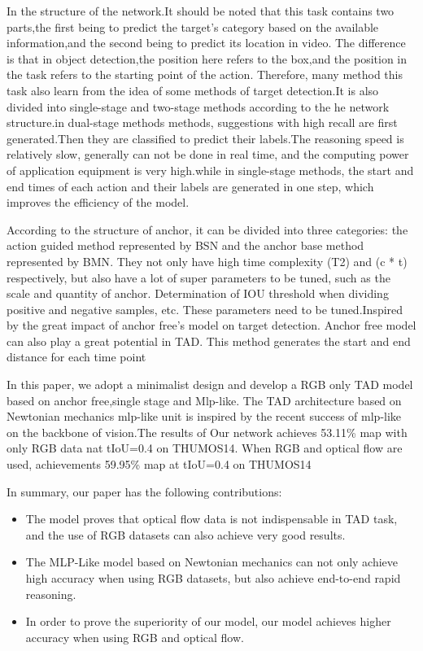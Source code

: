 \documentclass[10pt,twocolumn,letterpaper]{article}
\begin{document}
In the structure of the network.It should be noted that this task contains two parts,the first being to predict the target's category based on the available information,and the second being to predict its location in video. The difference is that in object detection,the position here refers to the box,and the position in the task refers to the starting point of the action. Therefore, many method this task also learn from the idea of some methods of target detection.It is also divided into single-stage and two-stage methods according to the he network structure.in dual-stage methods methods, suggestions with high recall are first generated.Then they are classified to predict their labels.The reasoning speed is relatively slow, generally can not be done in real time, and the computing power of application equipment is very high.while in single-stage methods, the start and end times of each action and their labels are generated in one step, which improves the efficiency of the model.

According to the structure of anchor, it can be divided into three categories: the action guided method represented by BSN\cite{lin2018bsn} and the anchor base method represented by BMN\cite{lin2019bmn}. They not only have high time complexity (T2) and (c * t) respectively, but also have a lot of super parameters to be tuned, such as the scale and quantity of anchor. Determination of IOU threshold when dividing positive and negative samples, etc. These parameters need to be tuned.Inspired by the great impact of anchor free's model on target detection. Anchor free model can also play a great potential in TAD. This method generates the start and end distance for each time point

In this paper, we adopt a minimalist design and develop a RGB only TAD model based on anchor free,single stage and Mlp-like. The TAD architecture based on Newtonian mechanics mlp-like unit is inspired by the recent success of mlp-like on the backbone of vision.The results of  Our network achieves 53.11\% map with only RGB data nat tIoU=0.4 on THUMOS14. When RGB and optical flow are used, achievements 59.95\% map
at tIoU=0.4 on THUMOS14

In summary, our paper has the following contributions:
\begin{itemize}
    \item[]The model proves that optical flow data is not indispensable in TAD task, and the use of RGB datasets can also achieve very good results.
    \item[]The MLP-Like model based on Newtonian mechanics can not only achieve high accuracy when using RGB datasets, but also achieve end-to-end rapid reasoning.
    \item[]In order to prove the superiority of our model, our model achieves higher accuracy when using RGB and optical flow.
\end{itemize}
\end{document}
